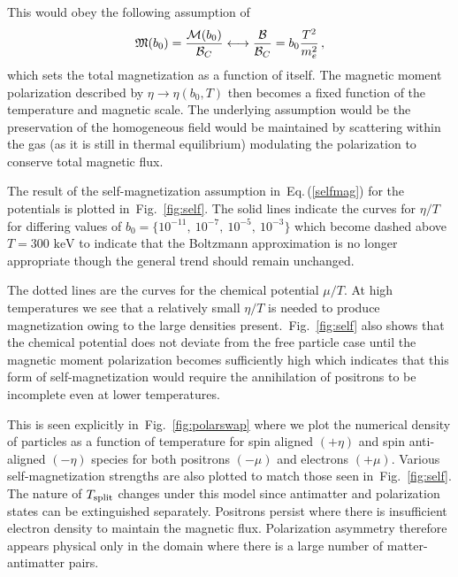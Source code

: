 \documentclass[aps,prd,floatfix,reprint]{revtex4-2}
\newcommand*{\keV}{\text{ keV}}
\newcommand{\req}[1]{Eq.\,(\ref{#1})}
\newcommand{\rf}[1]{Fig.~{\ref{#1}}}
\begin{document}
This would obey the following assumption of
\begin{align}
 \label{selfmag}
 {\mathfrak M}(b_{0})=\frac{{\cal M}(b_0)}{{\cal B}_{C}}\longleftrightarrow\frac{\cal B}{{\cal B}_{C}}=b_{0}\frac{T^{2}}{m_{e}^{2}}\,,
\end{align}
which sets the total magnetization as a function of itself. The magnetic moment polarization described by $\eta\rightarrow\eta(b_{0},T)$ then becomes a fixed function of the temperature and magnetic scale. The underlying assumption would be the preservation of the homogeneous field would be maintained by scattering within the gas (as it is still in thermal equilibrium) modulating the polarization to conserve total magnetic flux.

The result of the self-magnetization assumption in~\req{selfmag} for the potentials is plotted in~\rf{fig:self}. The solid lines indicate the curves for $\eta/T$ for differing values of $b_{0}=\{10^{-11},\ 10^{-7},\ 10^{-5},\ 10^{-3}\}$ which become dashed above $T=300\keV$ to indicate that the Boltzmann approximation is no longer appropriate though the general trend should remain unchanged. 

The dotted lines are the curves for the chemical potential $\mu/T$. At high temperatures we see that a relatively small $\eta/T$ is needed to produce magnetization owing to the large densities present.~\rf{fig:self} also shows that the chemical potential does not deviate from the free particle case until the magnetic moment polarization becomes sufficiently high which indicates that this form of self-magnetization would require the annihilation of positrons to be incomplete even at lower temperatures.

This is seen explicitly in~\rf{fig:polarswap} where we plot the numerical density of particles as a function of temperature for spin aligned $(+\eta)$ and spin anti-aligned $(-\eta)$ species for both positrons $(-\mu)$ and electrons $(+\mu)$. Various self-magnetization strengths are also plotted to match those seen in~\rf{fig:self}. The nature of $T_{\rm split}$ changes under this model since antimatter and polarization states can be extinguished separately. Positrons persist where there is insufficient electron density to maintain the magnetic flux. Polarization asymmetry therefore appears physical only in the domain where there is a large number of matter-antimatter pairs.
\end{document}
